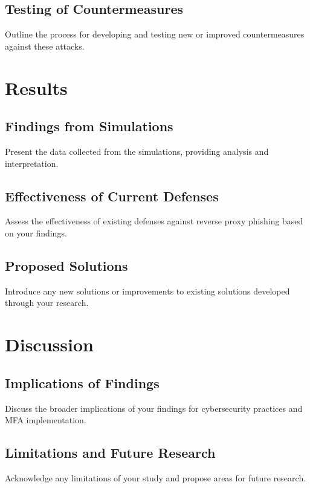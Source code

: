 \documentclass[12pt]{report}
\begin{document}
\section{Testing of Countermeasures}
Outline the process for developing and testing new or improved countermeasures
against these attacks.

\chapter{Results}
\section{Findings from Simulations}
Present the data collected from the simulations, providing analysis and interpretation.

\section{Effectiveness of Current Defenses}
Assess the effectiveness of existing defenses against reverse proxy phishing based
on your findings.

\section{Proposed Solutions}
Introduce any new solutions or improvements to existing solutions developed through
your research.

\chapter{Discussion}
\section{Implications of Findings}
Discuss the broader implications of your findings for cybersecurity practices and
MFA implementation.

\section{Limitations and Future Research}
Acknowledge any limitations of your study and propose areas for future research.

\newpage


\end{document}
